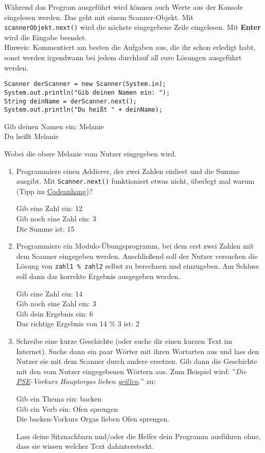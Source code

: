 \documentclass{../../sheet}
\begin{document}
\newpage
{}
Während das Program ausgeführt wird können auch Werte aus der Konsole eingelesen werden. Das geht mit einem Scanner-Objekt. Mit \texttt{scannerObjekt.next()} wird die nächste eingegebene Zeile eingelesen. Mit \textbf{Enter} wird die Eingabe beendet.\\
Hinweis: Kommentiert am besten die Aufgaben aus, die ihr schon erledigt habt, sonst werden irgendwann bei jedem durchlauf all eure Lösungen ausgeführt werden.
\begin{verbatim}
Scanner derScanner = new Scanner(System.in);
System.out.println("Gib deinen Namen ein: ");
String deinName = derScanner.next();
System.out.println("Du heißt " + deinName);
\end{verbatim}
\begin{ausgabe}
  Gib deinen Namen ein: Melanie\\
  Du heißt Melanie
\end{ausgabe}
Wobei die obere Melanie vom Nutzer eingegeben wird.

\begin{enumerate}
    \item Programmiere einen Addierer, der zwei Zahlen einliest und die Summe ausgibt. Mit \texttt{Scanner.next()} funktioniert etwas nicht, überlegt mal warum (Tipp im \hyperlink{Aufgabe_2.1}{Codeanhang})?
\begin{ausgabe}
Gib eine Zahl ein: 12\\
Gib noch eine Zahl ein: 3\\
Die Summe ist: 15
\end{ausgabe}
    \item Programmiere ein Modulo-Übungsprogramm, bei dem erst zwei Zahlen mit dem Scanner eingegeben werden. Anschließend soll der Nutzer versuchen die Lösung von \texttt{zahl1 \% zahl2} selbst zu berechnen und einzugeben. Am Schluss soll dann das korrekte Ergebnis ausgegeben werden.
\begin{ausgabe}
Gib eine Zahl ein: 14\\
Gib noch eine Zahl ein: 3\\
Gib dein Ergebnis ein: 6\\
Das richtige Ergebnis von 14 \% 3 ist: 2
\end{ausgabe}
    \item Schreibe eine kurze Geschichte (oder suche dir einen kurzen Text im Internet). Suche dann ein paar Wörter mit ihren Wortarten aus und lass den Nutzer sie mit dem Scanner durch andere ersetzen. Gib dann die Geschichte mit den vom Nutzer eingegebenen Wörtern aus. Zum Beispiel wird: ''\textit{Die \underline{PSE}-Vorkurs Hauptorgas lieben \underline{grillen}.}'' \space zu:
          \begin{ausgabe}
              Gib ein Thema ein: backen\\
              Gib ein Verb ein: Ofen sprengen\\
              Die backen-Vorkurs Orgas lieben Ofen sprengen.
          \end{ausgabe}
          Lass deine Sitznachbarn und/oder die Helfer dein Programm ausführen ohne, dass sie wissen welcher Text dahintersteckt.
\end{enumerate}
\end{document}
